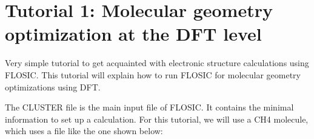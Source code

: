 \documentclass[letterpaper,10pt,english,openany,oneside]{sphinxmanual}
\begin{document}
\section{Tutorial 1: Molecular geometry optimization at the DFT level}
\label{\detokenize{tutorials/dtutorials/tutorial1:tutorial-1-molecular-geometry-optimization-at-the-dft-level}}\label{\detokenize{tutorials/dtutorials/tutorial1::doc}}
\sphinxAtStartPar
Very simple  tutorial  to get acquainted with electronic structure calculations using FLOSIC. This tutorial will explain how to run FLOSIC for molecular
geometry optimizations using DFT.

\sphinxAtStartPar
The CLUSTER file is the main input file of FLOSIC. It contains the minimal information to set up a calculation. For this tutorial, we will use a CH4 molecule, which
uses a  file like the one shown below:

\begin{sphinxVerbatim}[commandchars=\\\{\}]
            
                             
                             
       
       
     
     
     
                       
          
\end{sphinxVerbatim}
\end{document}
